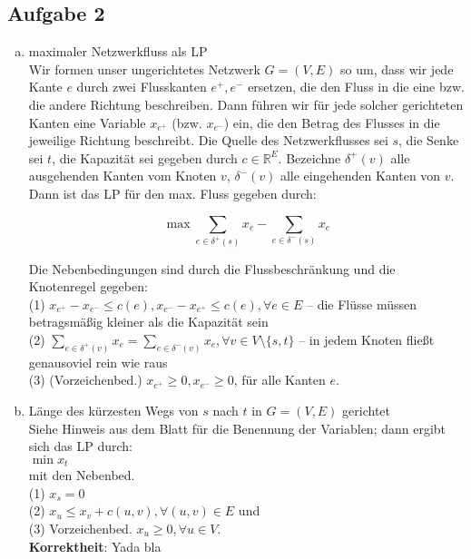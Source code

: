 \documentclass[11pt,a4paper,ngerman]{article}
\begin{document}
\subsection*{Aufgabe 2}
\begin{enumerate}[a)]
\item maximaler Netzwerkfluss als LP \\
Wir formen unser ungerichtetes Netzwerk $G = (V,E)$ so um, dass wir jede Kante $e$ durch zwei Flusskanten $e^+, e^-$
ersetzen, die den Fluss in die eine bzw. die andere Richtung beschreiben. Dann führen wir für jede solcher
gerichteten Kanten eine Variable $x_{e^+}$ (bzw. $x_{e^-}$) ein, die den Betrag des Flusses in die jeweilige 
Richtung beschreibt. Die Quelle des Netzwerkflusses sei $s$, die Senke sei $t$, die Kapazität sei gegeben durch $c \in \mathbb{R}^{E}$. Bezeichne $\delta^+(v)$ alle ausgehenden Kanten vom Knoten $v$, $\delta^-(v)$ alle eingehenden Kanten von $v$. Dann ist das LP für den max. Fluss gegeben durch:

$$ \max \sum_{e \in \delta^+(s)} x_e - \sum_{e \in \delta^-(s)} x_e$$

Die Nebenbedingungen sind durch die Flussbeschränkung und die Knotenregel gegeben: \\
(1) $x_{e^+} - x_{e^-} \leq c(e), x_{e^-} - x_{e^+} \leq c(e), \forall e \in E$ -- die Flüsse müssen betragsmäßig kleiner als die Kapazität sein \\

(2) $\sum_{e \in \delta^+(v)} x_e = \sum_{e \in \delta^-(v)} x_e, \forall v \in V \setminus \{s,t\}$ -- in jedem Knoten fließt genausoviel rein wie raus \\

(3) (Vorzeichenbed.) $x_{e^+} \geq 0, x_{e^-} \geq 0$, für alle Kanten $e$.

\item Länge des kürzesten Wegs von $s$ nach $t$ in $G = (V,E)$ gerichtet \\
Siehe Hinweis aus dem Blatt für die Benennung der Variablen; dann ergibt sich das LP durch: \\
$ \min x_t $ \\
mit den Nebenbed. \\
(1) $x_s = 0$ \\
(2) $x_u \leq x_v + c(u,v), \forall (u,v) \in E$ und \\
(3) Vorzeichenbed. $x_u \geq 0, \forall u \in V$. \\

\textbf{Korrektheit}: Yada bla
\end{enumerate}
\end{document}
